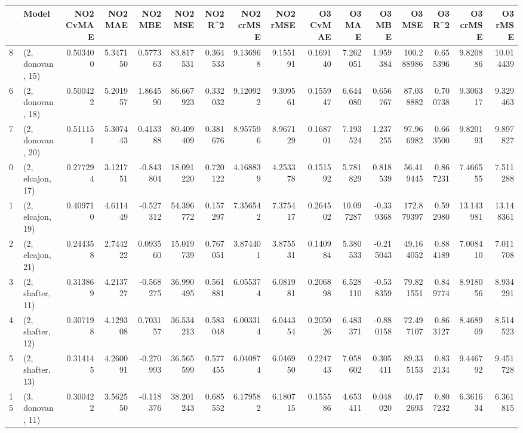 \begin{tabular}{llrrrrrrrrrrrrrr}
\toprule
{} &             Model &  NO2 CvMAE &   NO2 MAE &   NO2 MBE &    NO2 MSE &   NO2 R\textasciicircum2 &  NO2 crMSE &  NO2 rMSE &  O3 CvMAE &     O3 MAE &    O3 MBE &      O3 MSE &    O3 R\textasciicircum2 &   O3 crMSE &    O3 rMSE \\
\midrule
8  &  (2, donovan, 15) &   0.503400 &  5.347150 &  0.577363 &  83.817531 &  0.364533 &   9.136968 &  9.155191 &  0.169140 &   7.262051 &  1.959384 &  100.288986 &  0.655396 &   9.820886 &  10.014439 \\
6  &  (2, donovan, 18) &   0.500422 &  5.201957 &  1.864590 &  86.667923 &  0.332032 &   9.120922 &  9.309561 &  0.155947 &   6.644080 &  0.656767 &   87.038882 &  0.700738 &   9.306317 &   9.329463 \\
7  &  (2, donovan, 20) &   0.511151 &  5.307443 &  0.413388 &  80.409409 &  0.381676 &   8.957596 &  8.967129 &  0.168701 &   7.193524 &  1.237255 &   97.966982 &  0.663500 &   9.820193 &   9.897827 \\
0  &  (2, elcajon, 17) &   0.277294 &  3.121751 & -0.843804 &  18.091220 &  0.720122 &   4.168839 &  4.253378 &  0.151592 &   5.781829 &  0.818539 &   56.419445 &  0.867231 &   7.466555 &   7.511288 \\
1  &  (2, elcajon, 19) &   0.409710 &  4.611449 & -0.527312 &  54.396772 &  0.157297 &   7.356542 &  7.375417 &  0.264502 &  10.097287 & -0.339368 &  172.879397 &  0.592980 &  13.143981 &  13.148361 \\
2  &  (2, elcajon, 21) &   0.244358 &  2.744222 &  0.093560 &  15.019739 &  0.767051 &   3.874401 &  3.875531 &  0.140984 &   5.380533 & -0.215043 &   49.164052 &  0.884189 &   7.008410 &   7.011708 \\
3  &  (2, shafter, 11) &   0.313869 &  4.213727 & -0.568275 &  36.990495 &  0.561881 &   6.055374 &  6.081981 &  0.206898 &   6.528110 & -0.538359 &   79.821551 &  0.849774 &   8.918056 &   8.934291 \\
4  &  (2, shafter, 12) &   0.307198 &  4.129308 &  0.703157 &  36.534213 &  0.583048 &   6.003314 &  6.044354 &  0.205026 &   6.483371 & -0.880158 &   72.497107 &  0.863127 &   8.468909 &   8.514523 \\
5  &  (2, shafter, 13) &   0.314145 &  4.260091 & -0.270993 &  36.565599 &  0.577455 &   6.040874 &  6.046950 &  0.224743 &   7.058602 &  0.305411 &   89.335153 &  0.832134 &   9.446792 &   9.451728 \\
15 &  (3, donovan, 11) &   0.300422 &  3.562550 & -0.118376 &  38.201243 &  0.685552 &   6.179582 &  6.180715 &  0.155586 &   4.653411 &  0.048020 &   40.472693 &  0.807232 &   6.361634 &   6.361815 \\

\end{tabular}
